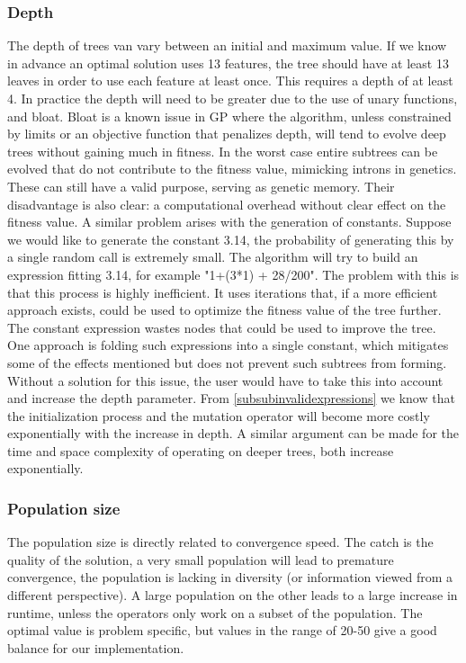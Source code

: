 \subsubsection{Depth}
The depth of trees van vary between an initial and maximum value. If we know in advance an optimal solution uses 13 features, the tree should have at least 13 leaves in order to use each feature at least once. This requires a depth of at least 4. In practice the depth will need to be greater due to the use of unary functions, and bloat. Bloat is a known issue in GP \cite{GPBloat}
where the algorithm, unless constrained by limits or an objective function that penalizes depth, will tend to evolve deep trees without gaining much in fitness. In the worst case entire subtrees can be evolved that do not contribute to the fitness value, mimicking introns in genetics. These can still have a valid purpose, serving as genetic memory. Their disadvantage is also clear: a computational overhead without clear effect on the fitness value.
A similar problem arises with the generation of constants. Suppose we would like to generate the constant 3.14, the probability of generating this by a single random call is extremely small. The algorithm will try to build an expression fitting 3.14, for example "1+(3*1) + 28/200". The problem with this is that this process is highly inefficient. It uses iterations that, if a more efficient approach exists, could be used to optimize the fitness value of the tree further. The constant expression wastes nodes that could be used to improve the tree. One approach is folding such expressions into a single constant, which mitigates some of the effects mentioned but does not prevent such subtrees from forming.
Without a solution for this issue, the user would have to take this into account and increase the depth parameter. 
From \ref{subsubinvalidexpressions} we know that the initialization process and the mutation operator will become more costly exponentially with the increase in depth.
A similar argument can be made for the time and space complexity of operating on deeper trees, both increase exponentially.

\subsubsection{Population size}
The population size is directly related to convergence speed. The catch is the quality of the solution, a very small population will lead to premature convergence, the population is lacking in diversity (or information viewed from a different perspective).
A large population on the other leads to a large increase in runtime, unless the operators only work on a subset of the population. The optimal value is problem specific, but values in the range of 20-50 give a good balance for our implementation.

